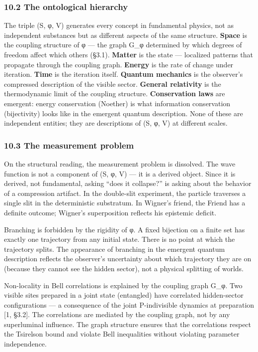 \documentclass[
  11pt,
]{article}
\begin{document}
\hypertarget{the-ontological-hierarchy}{%
\subsubsection{10.2 The ontological
hierarchy}\label{the-ontological-hierarchy}}

The triple (S, φ, V) generates every concept in fundamental physics, not
as independent substances but as different aspects of the same
structure. \textbf{Space} is the coupling structure of φ --- the graph
G\_φ determined by which degrees of freedom affect which others (§3.1).
\textbf{Matter} is the state --- localized patterns that propagate
through the coupling graph. \textbf{Energy} is the rate of change under
iteration. \textbf{Time} is the iteration itself. \textbf{Quantum
mechanics} is the observer's compressed description of the visible
sector. \textbf{General relativity} is the thermodynamic limit of the
coupling structure. \textbf{Conservation laws} are emergent: energy
conservation (Noether) is what information conservation (bijectivity)
looks like in the emergent quantum description. None of these are
independent entities; they are descriptions of (S, φ, V) at different
scales.

\hypertarget{the-measurement-problem}{%
\subsubsection{10.3 The measurement
problem}\label{the-measurement-problem}}

On the structural reading, the measurement problem is dissolved. The
wave function is not a component of (S, φ, V) --- it is a derived
object. Since it is derived, not fundamental, asking ``does it
collapse?'' is asking about the behavior of a compression artifact. In
the double-slit experiment, the particle traverses a single slit in the
deterministic substratum. In Wigner's friend, the Friend has a definite
outcome; Wigner's superposition reflects his epistemic deficit.

Branching is forbidden by the rigidity of φ. A fixed bijection on a
finite set has exactly one trajectory from any initial state. There is
no point at which the trajectory splits. The appearance of branching in
the emergent quantum description reflects the observer's uncertainty
about which trajectory they are on (because they cannot see the hidden
sector), not a physical splitting of worlds.

Non-locality in Bell correlations is explained by the coupling graph
G\_φ. Two visible sites prepared in a joint state (entangled) have
correlated hidden-sector configurations --- a consequence of the joint
P-indivisible dynamics at preparation {[}1, §3.2{]}. The correlations
are mediated by the coupling graph, not by any superluminal influence.
The graph structure ensures that the correlations respect the Tsirelson
bound and violate Bell inequalities without violating parameter
independence.
\end{document}
